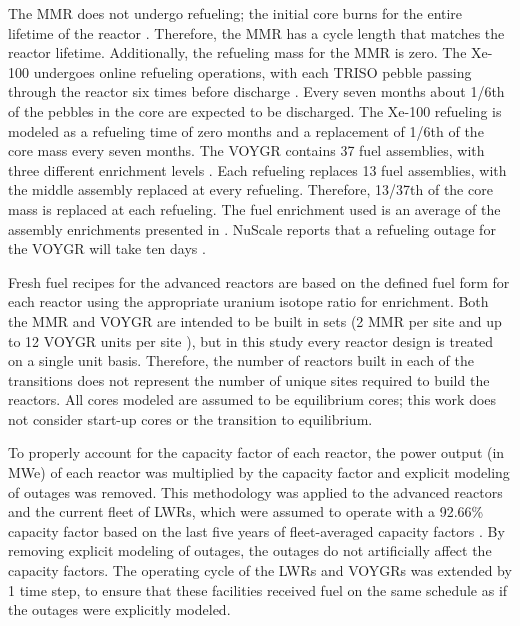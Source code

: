 The \gls{MMR} does not undergo refueling; the initial core
burns for the entire lifetime of the reactor \cite{mitchell_usnc_2020}. 
Therefore, the \gls{MMR} has a cycle length that 
matches the reactor lifetime. Additionally, the refueling mass for the
\gls{MMR} is zero. The Xe-100 undergoes online refueling operations, with 
each \gls{TRISO} pebble passing through the reactor six times before 
discharge \cite{mulder_overview_2021}. Every seven months about 1/6th 
of the pebbles in the core are expected to be discharged. The Xe-100 
refueling is modeled as a refueling time of zero months and a 
replacement of 1/6th of the core mass every seven months. 
The VOYGR contains 37 fuel assemblies, with three different enrichment 
levels \cite{nuscale_chapter_2020-1}. Each refueling replaces 13 fuel 
assemblies, with the middle assembly replaced at every refueling. 
Therefore, 13/37th of the core mass is replaced at each refueling. 
The fuel enrichment used is an average of the assembly enrichments 
presented in \cite{nuscale_chapter_2020-1}. NuScale reports that a refueling 
outage for the VOYGR will take ten days \cite{nuscale_nuscale_2022}. 

Fresh fuel recipes for the advanced reactors are based on the 
defined fuel form for each reactor using the appropriate uranium isotope 
ratio for enrichment. Both the \gls{MMR} and VOYGR are intended to be built 
in sets (2 \gls{MMR} per site \cite{noauthor_usnc_2021} and up to 12 VOYGR 
units per site \cite{reyes_nuscale_2021}), but in this study every reactor 
design is treated 
on a single unit basis. Therefore, the number of reactors built in each 
of the transitions does not represent the number of unique sites required 
to build the reactors. All cores modeled are assumed to be equilibrium cores; 
this work does not consider start-up cores or the transition to equilibrium. 

To properly account for the capacity factor of each reactor, the power output 
(in MWe) of each reactor was multiplied by the capacity factor and explicit 
modeling of outages was removed. This methodology was applied to the 
advanced reactors and the current fleet of \glspl{LWR}, which were assumed 
to operate with a 92.66\% capacity factor based on the last five years of 
fleet-averaged capacity factors 
\cite{us_energy_information_administration_electric_2022}. 
By removing explicit modeling of outages, the outages do not artificially affect 
the capacity factors. The operating cycle of the \glspl{LWR} and VOYGRs 
was extended by 1 time step, to ensure that these facilities received fuel 
on the same schedule as if the outages were explicitly modeled. 


